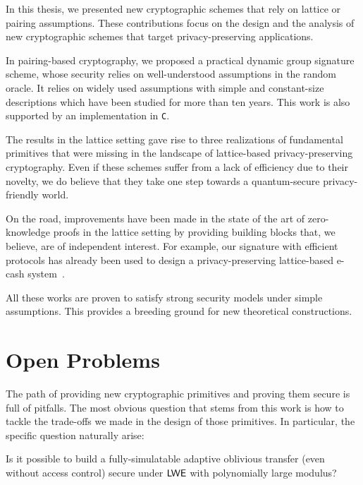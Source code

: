 \begin{comment}
\section %
\end{comment}

In this thesis, we presented new cryptographic schemes that rely on lattice or pairing assumptions.
These contributions focus on the design and the analysis of new cryptographic schemes that target privacy-preserving applications.

In pairing-based cryptography, we proposed a practical dynamic group signature scheme, whose security relies on well-understood assumptions in the random oracle.
It relies on widely used assumptions with simple and constant-size descriptions which have been studied for more than ten years.
This work is also supported by an implementation in \texttt{C}.

The results in the lattice setting gave rise to three realizations of fundamental primitives that were missing in the landscape of lattice-based privacy-preserving cryptography.
Even if these schemes suffer from a lack of efficiency due to their novelty, we do believe that they take one step towards a quantum-secure privacy-friendly world.

On the road, improvements have been made in the state of the art of zero-knowledge proofs in the lattice setting by providing building blocks that, we believe, are of independent interest.
For example, our signature with efficient protocols has already been used to design a privacy-preserving lattice-based e-cash system~\cite{LLNW17}.

All these works are proven to satisfy strong security models under simple assumptions.
This provides a breeding ground for new theoretical constructions.

\section*{Open Problems}

The path of providing new cryptographic primitives and proving them secure is full of pitfalls.
The most obvious question that stems from this work is how to tackle the trade-offs we made in the design of those primitives. In particular, the specific question naturally arise:

\begin{question}
  Is it possible to build a fully-simulatable adaptive oblivious transfer (even without access control) secure under $\mathsf{LWE}$ with polynomially large modulus?
\end{question}

